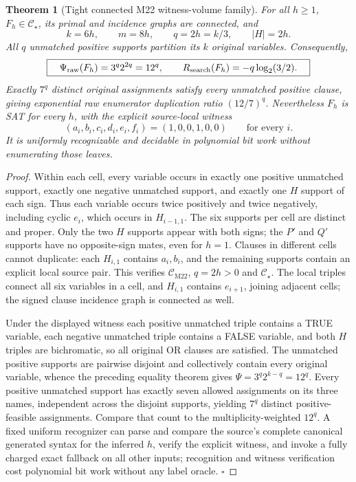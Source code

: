\documentclass[11pt]{article}
\newtheorem{theorem}{Theorem}
\newcommand{\CM}{\mathcal C_{\mathrm{M22}}}
\newcommand{\CS}{\mathcal C_\star}
\begin{document}
\begin{theorem}[Tight connected M22 witness-volume family]
For all \(h\ge1\), \(F_h\in\CS\), its primal and incidence graphs are connected, and
\[
 k=6h,\qquad m=8h,\qquad q=2h=k/3,\qquad |H|=2h.
\]
All \(q\) unmatched positive supports partition its \(k\) original variables. Consequently,
\[
\boxed{\quad\Psi_{\rm raw}(F_h)=3^q2^{2q}=12^q,
\qquad R_{\rm search}(F_h)=-q\log_2(3/2).\quad}
\]
Exactly \(7^q\) distinct original assignments satisfy every unmatched positive clause, giving exponential \emph{raw enumerator} duplication ratio \((12/7)^q\). Nevertheless \(F_h\) is SAT for every \(h\), with the explicit source-local witness
\[
 (a_i,b_i,c_i,d_i,e_i,f_i)=(1,0,0,1,0,0)\qquad\text{for every }i.
\]
It is uniformly recognizable and decidable in polynomial bit work without enumerating those leaves.
\end{theorem}
\begin{proof}
Within each cell, every variable occurs in exactly one positive unmatched support, exactly one negative unmatched support, and exactly one \(H\) support of each sign. Thus each variable occurs twice positively and twice negatively, including cyclic \(e_i\), which occurs in \(H_{i-1,1}\). The six supports per cell are distinct and proper. Only the two \(H\) supports appear with both signs; the \(P'\) and \(Q'\) supports have no opposite-sign mates, even for \(h=1\). Clauses in different cells cannot duplicate: each \(H_{i,1}\) contains \(a_i,b_i\), and the remaining supports contain an explicit local source pair. This verifies \(\CM\), \(q=2h>0\) and \(\CS\). The local triples connect all six variables in a cell, and \(H_{i,1}\) contains \(e_{i+1}\), joining adjacent cells; the signed clause incidence graph is connected as well.

Under the displayed witness each positive unmatched triple contains a TRUE variable, each negative unmatched triple contains a FALSE variable, and both \(H\) triples are bichromatic, so all original OR clauses are satisfied. The unmatched positive supports are pairwise disjoint and collectively contain every original variable, whence the preceding equality theorem gives \(\Psi=3^q2^{k-q}=12^q\). Every positive unmatched support has exactly seven allowed assignments on its three names, independent across the disjoint supports, yielding \(7^q\) distinct positive-feasible assignments. Compare that count to the multiplicity-weighted \(12^q\). A fixed uniform recognizer can parse and compare the source's complete canonical generated syntax for the inferred \(h\), verify the explicit witness, and invoke a fully charged exact fallback on all other inputs; recognition and witness verification cost polynomial bit work without any label oracle. \(\square\)
\end{proof}
\end{document}
